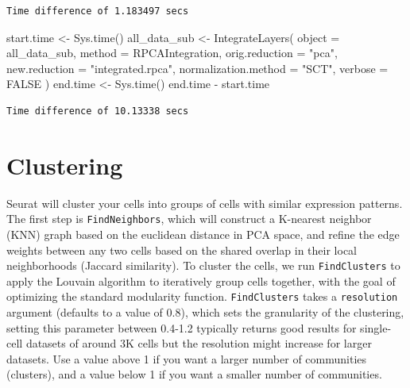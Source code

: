 \documentclass[
  letterpaper,
  DIV=11,
  numbers=noendperiod]{scrreprt}
\newenvironment{Shaded}{\begin{snugshade}}{\end{snugshade}}
\newcommand{\AttributeTok}[1]{\textcolor[rgb]{0.40,0.45,0.13}{#1}}
\newcommand{\ConstantTok}[1]{\textcolor[rgb]{0.56,0.35,0.01}{#1}}
\newcommand{\FunctionTok}[1]{\textcolor[rgb]{0.28,0.35,0.67}{#1}}
\newcommand{\NormalTok}[1]{\textcolor[rgb]{0.00,0.23,0.31}{#1}}
\newcommand{\OtherTok}[1]{\textcolor[rgb]{0.00,0.23,0.31}{#1}}
\newcommand{\SpecialCharTok}[1]{\textcolor[rgb]{0.37,0.37,0.37}{#1}}
\newcommand{\StringTok}[1]{\textcolor[rgb]{0.13,0.47,0.30}{#1}}
\begin{document}
\begin{verbatim}
Time difference of 1.183497 secs
\end{verbatim}

\begin{Shaded}
\begin{Highlighting}[]
\NormalTok{start.time }\OtherTok{\textless{}{-}} \FunctionTok{Sys.time}\NormalTok{()}
\NormalTok{all\_data\_sub }\OtherTok{\textless{}{-}} \FunctionTok{IntegrateLayers}\NormalTok{(}
  \AttributeTok{object =}\NormalTok{ all\_data\_sub, }\AttributeTok{method =}\NormalTok{ RPCAIntegration,}
  \AttributeTok{orig.reduction =} \StringTok{"pca"}\NormalTok{, }\AttributeTok{new.reduction =} \StringTok{"integrated.rpca"}\NormalTok{, }\AttributeTok{normalization.method =} \StringTok{"SCT"}\NormalTok{,}
  \AttributeTok{verbose =} \ConstantTok{FALSE}
\NormalTok{)}
\NormalTok{end.time }\OtherTok{\textless{}{-}} \FunctionTok{Sys.time}\NormalTok{()}
\NormalTok{end.time }\SpecialCharTok{{-}}\NormalTok{ start.time}
\end{Highlighting}
\end{Shaded}

\begin{verbatim}
Time difference of 10.13338 secs
\end{verbatim}

\section{Clustering}\label{clustering}

Seurat will cluster your cells into groups of cells with similar
expression patterns. The first step is \texttt{FindNeighbors}, which
will construct a K-nearest neighbor (KNN) graph based on the euclidean
distance in PCA space, and refine the edge weights between any two cells
based on the shared overlap in their local neighborhoods (Jaccard
similarity). To cluster the cells, we run \texttt{FindClusters} to apply
the Louvain algorithm to iteratively group cells together, with the goal
of optimizing the standard modularity function. \texttt{FindClusters}
takes a \texttt{resolution} argument (defaults to a value of 0.8), which
sets the granularity of the clustering, setting this parameter between
0.4-1.2 typically returns good results for single-cell datasets of
around 3K cells but the resolution might increase for larger datasets.
Use a value above 1 if you want a larger number of communities
(clusters), and a value below 1 if you want a smaller number of
communities.
\end{document}
